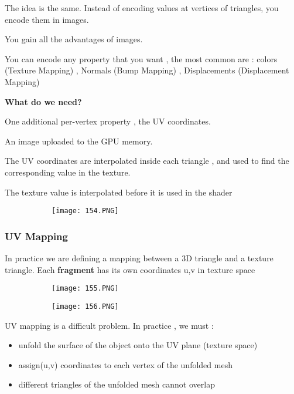 \documentclass{article}
\begin{document}
The idea is the same. Instead of encoding values at vertices of triangles, you encode them in images.

You gain all the advantages of images.

You can encode any property that you want , the most common are : colors (Texture Mapping) , Normals (Bump Mapping) , Displacements (Displacement Mapping)

\vspace{3mm}
\textbf{What do we need?}

One additional per-vertex property , the UV coordinates.

An image uploaded to the GPU memory.

The UV coordinates are interpolated inside each triangle , and used to find the corresponding value in the texture.

The texture value is interpolated before it is used in the shader


\begin{figure}[ht!]
  \centering
  \begin{subfigure}[b]{0.4\linewidth}
    \texttt{[image: 154.PNG]}
  \end{subfigure}
\end{figure}

\subsubsection{UV Mapping}

In practice we are defining a mapping between a 3D triangle and a texture triangle.
Each \textbf{fragment} has its own coordinates u,v in texture space 

\begin{figure}[ht!]
  \centering
  \begin{subfigure}[b]{0.3\linewidth}
    \texttt{[image: 155.PNG]}
  \end{subfigure}
  \begin{subfigure}[b]{0.3\textwidth}
         \centering
         \texttt{[image: 156.PNG]}
     \end{subfigure}
\end{figure}

UV mapping is a difficult problem. 
In practice , we must : 
\begin{itemize}
    \item unfold the surface of the object onto the UV plane (texture space)
    \item assign(u,v) coordinates to each vertex of the unfolded mesh
    \item different triangles of the unfolded mesh cannot overlap
\end{itemize}
\end{document}
